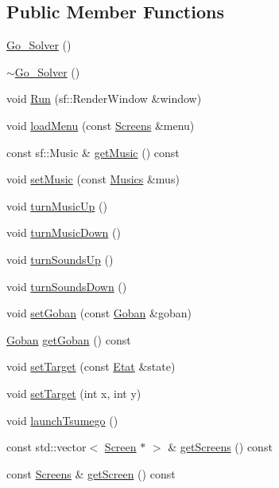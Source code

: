 \subsection*{Public Member Functions}
\begin{DoxyCompactItemize}
\item 
\hyperlink{class_go___solver_a30bd2f9d195a5553cc683f8314ea4b58}{Go\+\_\+\+Solver} ()
\item 
\hyperlink{class_go___solver_a63f22d429ea0e1c881d0b276edfe4b0e}{$\sim$\+Go\+\_\+\+Solver} ()
\item 
void \hyperlink{class_go___solver_a84c021a62506ef8f5d43aae109298fe0}{Run} (sf\+::\+Render\+Window \&window)
\item 
void \hyperlink{class_go___solver_a27ceb252dd57ac88d0dc2dbb04a25e32}{load\+Menu} (const \hyperlink{_globals_8h_a3d5776bab98402b03be09156bacf4f68}{Screens} \&menu)
\item 
const sf\+::\+Music \& \hyperlink{class_go___solver_a321bc84b99b5ebdc2fbc59222aae8c74}{get\+Music} () const
\item 
void \hyperlink{class_go___solver_a9b569ce8f1075a0c0136a46c62bd403a}{set\+Music} (const \hyperlink{_globals_8h_ad531d267a0e8da4d0683298e06912177}{Musics} \&mus)
\item 
void \hyperlink{class_go___solver_a840b3c44ffd48baf0b7f2b4d15a831a0}{turn\+Music\+Up} ()
\item 
void \hyperlink{class_go___solver_a9bf8a0287fac1692ddf3b640ae1b04fe}{turn\+Music\+Down} ()
\item 
void \hyperlink{class_go___solver_a461b1fecf636b55d6b9f31b0035366c3}{turn\+Sounds\+Up} ()
\item 
void \hyperlink{class_go___solver_a1d7d0fad019f2d33caebb6cfe11d1f42}{turn\+Sounds\+Down} ()
\item 
void \hyperlink{class_go___solver_a8452c66187c526e0a6051bbb42b9bbda}{set\+Goban} (const \hyperlink{class_goban}{Goban} \&goban)
\item 
\hyperlink{class_goban}{Goban} \hyperlink{class_go___solver_a95c1c268123a76b4f2db5b183bc721b6}{get\+Goban} () const
\item 
void \hyperlink{class_go___solver_af792237fc55c0db4f5c5cc3299d51935}{set\+Target} (const \hyperlink{class_etat}{Etat} \&state)
\item 
void \hyperlink{class_go___solver_ab2a2c57a24b076a6729e01504ef25377}{set\+Target} (int x, int y)
\item 
void \hyperlink{class_go___solver_a6ca744f1f4586c3f90f2e47915034baf}{launch\+Tsumego} ()
\item 
const std\+::vector$<$ \hyperlink{class_screen}{Screen} $\ast$ $>$ \& \hyperlink{class_go___solver_aa86fa44c1be38ba004ff2f0475094cd1}{get\+Screens} () const
\item 
const \hyperlink{_globals_8h_a3d5776bab98402b03be09156bacf4f68}{Screens} \& \hyperlink{class_go___solver_a40386a16847e889ffd280d5c6b993462}{get\+Screen} () const
\end{DoxyCompactItemize}
